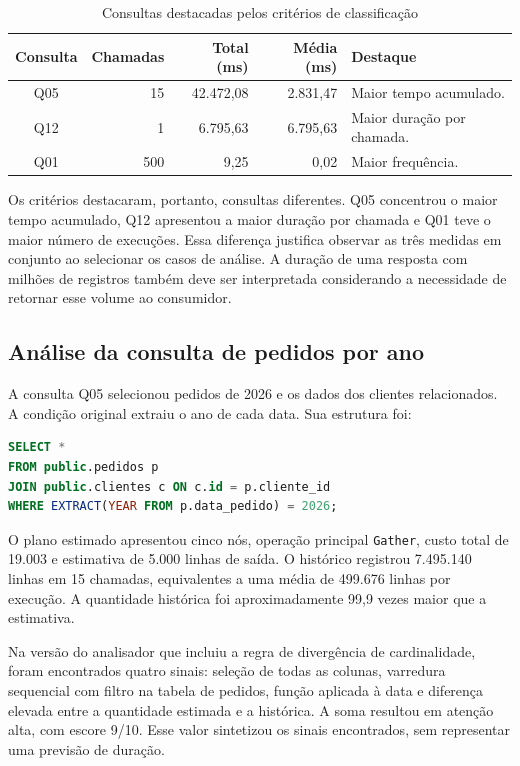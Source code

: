 \documentclass{UNESC}
\newcommand{\fonteautor}{\par\smallskip{\footnotesize Fonte: elaboração própria.}}
\begin{document}
\begin{table}[H]
\centering
\caption{Consultas destacadas pelos critérios de classificação}
\label{tab:rankings}
\begin{singlespace}\small
\begin{tabularx}{\linewidth}{c r r r Y}
\toprule
\textbf{Consulta} & \textbf{Chamadas} & \textbf{Total (ms)} & \textbf{Média (ms)} & \textbf{Destaque}\\
\midrule
Q05 & 15 & 42.472,08 & 2.831,47 & Maior tempo acumulado.\\[0.5em]
Q12 & 1 & 6.795,63 & 6.795,63 & Maior duração por chamada.\\[0.5em]
Q01 & 500 & 9,25 & 0,02 & Maior frequência.\\
\bottomrule
\end{tabularx}
\fonteautor
\end{singlespace}
\end{table}

Os critérios destacaram, portanto, consultas diferentes. Q05 concentrou o maior tempo acumulado, Q12 apresentou a maior duração por chamada e Q01 teve o maior número de execuções. Essa diferença justifica observar as três medidas em conjunto ao selecionar os casos de análise. A duração de uma resposta com milhões de registros também deve ser interpretada considerando a necessidade de retornar esse volume ao consumidor.

\subsection{Análise da consulta de pedidos por ano}

A consulta Q05 selecionou pedidos de 2026 e os dados dos clientes relacionados. A condição original extraiu o ano de cada data. Sua estrutura foi:

\begin{lstlisting}[language=SQL]
SELECT *
FROM public.pedidos p
JOIN public.clientes c ON c.id = p.cliente_id
WHERE EXTRACT(YEAR FROM p.data_pedido) = 2026;
\end{lstlisting}

O plano estimado apresentou cinco nós, operação principal \texttt{Gather}, custo total de 19.003 e estimativa de 5.000 linhas de saída. O histórico registrou 7.495.140 linhas em 15 chamadas, equivalentes a uma média de 499.676 linhas por execução. A quantidade histórica foi aproximadamente 99,9 vezes maior que a estimativa.

Na versão do analisador que incluiu a regra de divergência de cardinalidade, foram encontrados quatro sinais: seleção de todas as colunas, varredura sequencial com filtro na tabela de pedidos, função aplicada à data e diferença elevada entre a quantidade estimada e a histórica. A soma resultou em atenção alta, com escore 9/10. Esse valor sintetizou os sinais encontrados, sem representar uma previsão de duração.
\end{document}
